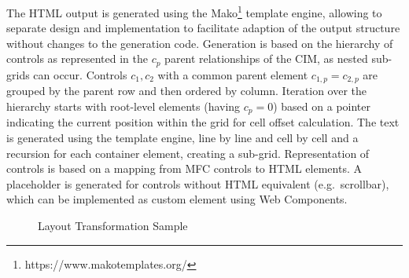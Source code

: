 The HTML output is generated using the Mako\footnote{https://www.makotemplates.org/} template engine, allowing to separate design and implementation to facilitate adaption of the output structure without changes to the generation code.
Generation is based on the hierarchy of controls as represented in the \(c_p\) parent relationships of the CIM, as nested sub-grids can occur.
Controls \(c_1, c_2\) with a common parent element \(c_{1,p}= c_{2,p}\) are grouped by the parent row and then ordered by column.
Iteration over the hierarchy starts with root-level elements (having \(c_p = 0\)) based on a pointer indicating the current position within the grid for cell offset calculation.
The text is generated using the template engine, line by line and cell by cell and a recursion for each container element, creating a sub-grid.
Representation of controls is based on a mapping from MFC controls to HTML elements.
A placeholder is generated for controls without HTML equivalent (e.g.~scrollbar), which can be implemented as custom element using Web Components.

\begin{figure}
\centering



\caption{Layout Transformation Sample}

\label{fig:uitransformer.sample}

\end{figure}

